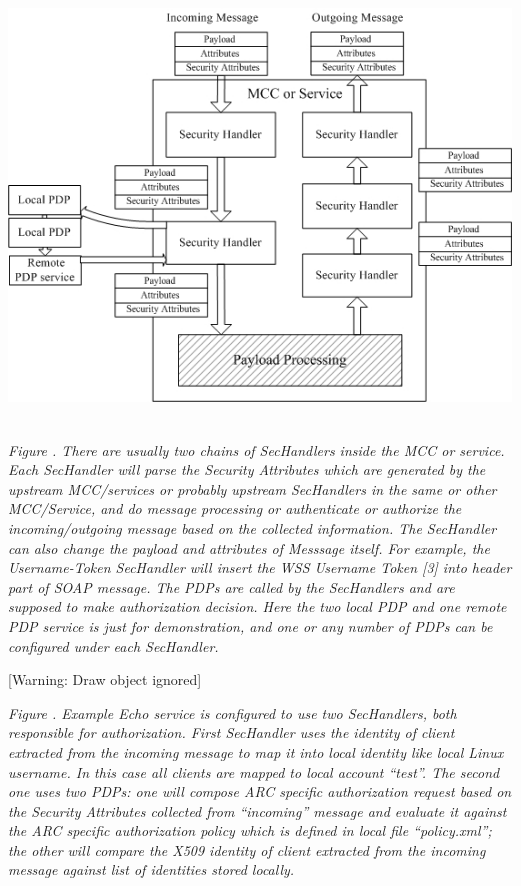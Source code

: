 \documentclass[a4paper]{article}
\newcounter{Figure}
\renewcommand\theFigure{\arabic{Figure}}
\begin{document}
\bigskip


\includegraphics[width=5.7709in,height=4.5209in]{SecurityFrameworkofARC1-img2.jpg}


{\itshape\color{black}
Figure \stepcounter{Figure}{\theFigure}. There are usually two chains of
SecHandlers inside the MCC or service. Each SecHandler will parse the
Security Attributes which are generated by the upstream MCC/services or
probably upstream SecHandlers in the same or other MCC/Service, and do
message processing or authenticate or authorize the incoming/outgoing
message based on the collected information. The SecHandler can also
change the payload and attributes of Messsage itself. For example, the
Username-Token SecHandler will insert the WSS Username Token [3] into
header part of SOAP message. The PDPs are called by the SecHandlers and
are supposed to make authorization decision. Here the two local PDP and
one remote PDP service is just for demonstration, and one or any number
of PDPs can be configured under each SecHandler.}


\bigskip

[Warning: Draw object ignored]

{\centering{}\itshape\color{black}
Figure \stepcounter{Figure}{\theFigure}. Example Echo service is
configured to use two SecHandlers, both responsible for authorization.
First SecHandler uses the identity of client extracted from the
incoming message to map it into local identity like local Linux
username. In this case all clients are mapped to local account
{\textquotedblleft}test{\textquotedblright}. The second one uses two
PDPs: one will compose ARC specific authorization request based on the
Security Attributes collected from
{\textquotedblleft}incoming{\textquotedblright} message and evaluate it
against the ARC specific authorization policy which is defined in local
file {\textquotedblleft}policy.xml{\textquotedblright}; the other will
compare the X509 identity of client extracted from the incoming message
against list of identities stored locally.
\par}
\end{document}
